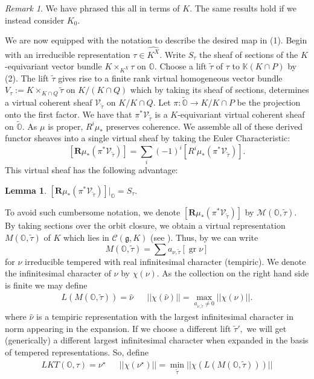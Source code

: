 \documentclass[letterpaper,twosided,11pt]{article}
\theoremstyle{plain}
\newtheorem{lemma}[theorem]{Lemma}
\theoremstyle{definition}
\theoremstyle{remark}
\newtheorem{remark}{Remark}
\newcommand{\OO}{\mathbb{O}}
\newcommand{\lie}[1]{\mathfrak{#1}}
\begin{document}
\begin{remark} 
	We have phrased this all in terms of $K.$ The same results hold if we instead consider $K_0.$ 
\end{remark}    









We are now equipped with the notation to describe the desired map in (1). Begin with an irreducible representation $\tau\in \widehat{K^X}.$ Write $S_\tau$ the sheaf of sections of the $K$-equivariant vector bundle $K\times_{K^X} \tau$ on $\OO.$ Choose a lift $\tilde{\tau}$ of $\tau$ to $\mathbb{K}(K\cap P)$ by (2). The lift $\tilde{\tau}$ gives rise to a finite rank virtual homogeneous vector bundle $V_\tau:=K\times_{K\cap Q}\tilde{\tau}$ on $K/(K\cap Q)$ which by taking its sheaf of sections, determines a virtual coherent sheaf $\mathcal{V}_{\tilde{\tau}}$ on $K/K\cap Q.$ Let $\pi:\widetilde{\OO}\to K/K\cap P$ be the projection onto the first factor. We have that $\pi^*\mathcal{V}_{\tilde{\tau}}$ is a $K$-equivariant virtual coherent sheaf on $\widetilde{\OO}.$ As $\mu$ is proper, $R^i\mu_*$ preserves coherence. We assemble all of these derived functor sheaves into a single virtual sheaf by taking the Euler Characteristic: \[ [\textbf{R}\mu_*(\pi^*\mathcal{V}_{\tilde{\tau}})]=\sum_i (-1)^i[R^i\mu_*(\pi^*\mathcal{V}_{\tilde{\tau}})].    \]
This virtual sheaf has the following advantage: 
\begin{lemma}  $[\textbf{R}\mu_*(\pi^*\mathcal{V}_{\tilde{\tau}})]|_\OO=S_\tau.$
\end{lemma} 
To avoid such cumbersome notation, we denote $[\textbf{R}\mu_*(\pi^*\mathcal{V}_{\tilde{\tau}})]$ by $\mathcal{M}(\OO,\tilde{\tau}).$ By taking sections over the orbit closure, we obtain a virtual representation $M(\OO,\tilde{\tau})$ of $K$ which lies in $\mathcal{C}(\lie{g},K)$ (see \cite[Definition 6.8]{Vogan1998}). Thus, by \cite[Theorem 8.2]{Vogan1998} we can write \[ M(\OO,\tilde{\tau})=\sum a_{\nu,\tilde{\tau}} [\operatorname{gr} \nu] \]
for $\nu$ irreducible tempered with real infinitesimal character (tempiric). We denote the infinitesimal character of $\nu$ by $\chi(\nu)$.  As the collection on the right hand side is finite we may define \begin{align} L(M(\OO,\tilde{\tau}))=\hat{\nu}&& ||\chi(\hat{\nu})||=\max_{a_{\nu, \tilde{\tau}}\neq 0} ||\chi(\nu)||. \end{align} where $\hat{\nu}$ is a tempiric representation with the largest infinitesimal character in norm appearing in the expansion. If we choose a different lift $\tilde{\tau}',$ we will get (generically) a different largest infinitesimal character when expanded in the basis of tempered representations. So, define \begin{align}  LKT(\OO,\tau)=\nu^\star && ||\chi(\nu^\star)||= \min_{\tilde{\tau}} ||\chi(L(M(\OO,\tilde{\tau})))|| \end{align} 
\end{document}

